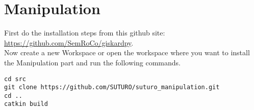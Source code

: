 \documentclass[main.tex]{subfiles}
\begin{document}
\section{Manipulation}

First do the installation steps from this github site:\\
	\url{https://github.com/SemRoCo/giskardpy}.\\
	
Now create a new Workspace or open the workspace where you want to install the Manipulation part and run the following commands.	
\begin{lstlisting}
cd src
git clone https://github.com/SUTURO/suturo_manipulation.git
cd ..
catkin build  \end{lstlisting}
	
	
\end{document}
